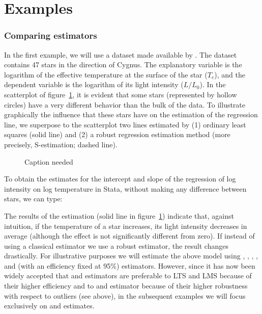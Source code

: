 \section{Examples}

\subsubsection{Comparing estimators} 

In the first example, we will use a dataset made available by
\citet{rousseeuw:leroy:1987}. The dataset contains 47 stars in the direction of
Cygnus. The explanatory variable is the logarithm of the effective temperature
at the surface of the star ($T_{e}$), and the dependent variable is the
logarithm of its light intensity ($L/L_{0}$). In the scatterplot of
figure~\ref{fig:stars_scatterplot}, it is evident that some stars (represented
by hollow circles) have a very different behavior than the bulk of the data. To
illustrate graphically the influence that these stars have on the estimation of
the regression line, we superpose to the scatterplot two lines estimated by (1)
ordinary least squares (solid line) and (2) a robust regression estimation
method (more precisely, S-estimation; dashed line).                             


\begin{figure}[h!]
    \centering
    \caption{\alert{Caption needed}}
    \label{fig:stars_scatterplot}
\end{figure}

To obtain the  estimates for the intercept and slope of the regression
of log intensity on log temperature in Stata, without making any difference 
between stars, we can type:

\begin{stlog}

\end{stlog}

The results of the  estimation (solid line in
figure~\ref{fig:stars_scatterplot}) indicate that, against intuition, if the
temperature of a star increases, its light intensity decreases in average
(although the effect is not significantly different from zero). If instead of
using a classical estimator we use a robust estimator, the result changes
drastically. For illustrative purposes we will estimate the above model using
, , , ,  and  (with an
efficiency fixed at 95\%) estimators. However, since it has now been widely
accepted that  and  estimators are preferable to LTS and LMS
because of their higher efficiency and to  and  estimator
because of their higher robustness with respect to outliers (see above), in the
subsequent examples we will focus exclusively on  and 
estimates.

